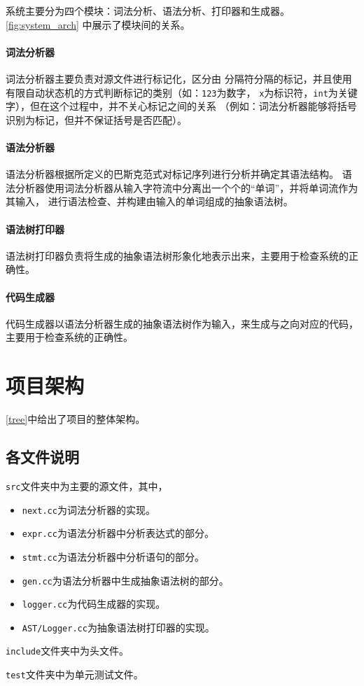 系统主要分为四个模块：词法分析、语法分析、打印器和生成器。\autoref{fig:system_arch}
中展示了模块间的关系。

\paragraph{词法分析器} 词法分析器主要负责对源文件进行标记化，区分由
分隔符分隔的标记，并且使用有限自动状态机的方式判断标记的类别（如：{\tt 123}为数字，
{\tt x}为标识符，{\tt int}为关键字），但在这个过程中，并不关心标记之间的关系
\cite{aho1986compilers}（例如：词法分析器能够将括号识别为标记，但并不保证括号是否匹配）。

\paragraph{语法分析器}
语法分析器根据所定义的巴斯克范式对标记序列进行分析并确定其语法结构。
语法分析器使用词法分析器从输入字符流中分离出一个个的“单词”，并将单词流作为其输入，
进行语法检查、并构建由输入的单词组成的抽象语法树\cite{muchnick1997advanced}。

\paragraph{语法树打印器}
语法树打印器负责将生成的抽象语法树形象化地表示出来，主要用于检查系统的正确性。

\paragraph{代码生成器}
代码生成器以语法分析器生成的抽象语法树作为输入，来生成与之向对应的代码，
主要用于检查系统的正确性。

\section{项目架构}

\autoref{tree}中给出了项目的整体架构。


\subsection{各文件说明}

{\tt src}文件夹中为主要的源文件，其中，
\begin{itemize}
	\item {\tt next.cc}为词法分析器的实现。
	\item {\tt expr.cc}为语法分析器中分析表达式的部分。
	\item {\tt stmt.cc}为语法分析器中分析语句的部分。
	\item {\tt gen.cc}为语法分析器中生成抽象语法树的部分。
	\item {\tt logger.cc}为代码生成器的实现。
	\item {\tt AST/Logger.cc}为抽象语法树打印器的实现。
\end{itemize}

{\tt include}文件夹中为头文件。

{\tt test}文件夹中为单元测试文件。

